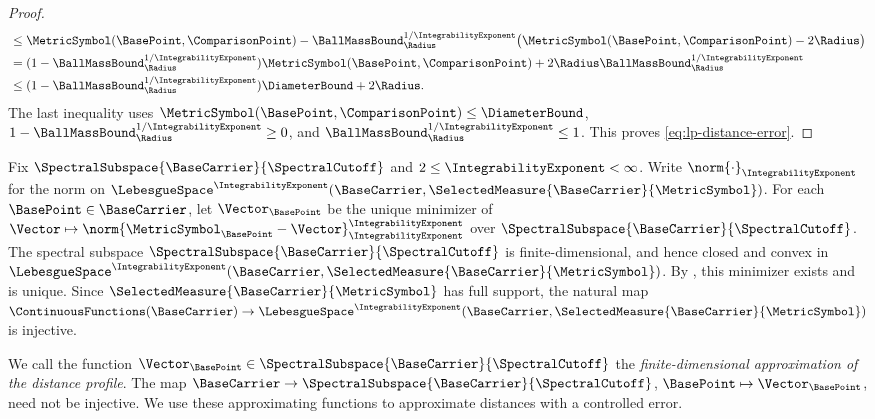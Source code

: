 \begin{proof}
\[\begin{aligned}
 &\leq \MetricSymbol(\BasePoint,\ComparisonPoint)
 -\BallMassBound_\Radius^{1/\IntegrabilityExponent}
 \bigl(\MetricSymbol(\BasePoint,\ComparisonPoint)-2\Radius\bigr)\\
 &= (1-\BallMassBound_\Radius^{1/\IntegrabilityExponent})
      \MetricSymbol(\BasePoint,\ComparisonPoint)
       +2\Radius\BallMassBound_\Radius^{1/\IntegrabilityExponent}\\
 &\leq
 (1-\BallMassBound_\Radius^{1/\IntegrabilityExponent})
      \DiameterBound+2\Radius.
 \end{aligned}
\]
The last inequality uses
$\MetricSymbol(\BasePoint,\ComparisonPoint)\leq\DiameterBound$,
$1-\BallMassBound_\Radius^{1/\IntegrabilityExponent}\geq0$,
and
$\BallMassBound_\Radius^{1/\IntegrabilityExponent}\leq1$.
This proves \eqref{eq:lp-distance-error}.
\end{proof}

Fix
$\SpectralSubspace{\BaseCarrier }{\SpectralCutoff }$
and
$2\leq \IntegrabilityExponent <\infty$.
Write $\norm{\cdot}_\IntegrabilityExponent$ for the norm on
$\LebesgueSpace^\IntegrabilityExponent(\BaseCarrier,\SelectedMeasure{\BaseCarrier}{\MetricSymbol})$.
For each
$\BasePoint \in \BaseCarrier $,
let
$\Vector _\BasePoint $
be the unique minimizer of
$\Vector \mapsto\norm{\MetricSymbol _\BasePoint -\Vector }_\IntegrabilityExponent ^\IntegrabilityExponent $
over
$\SpectralSubspace{\BaseCarrier }{\SpectralCutoff }$.
The spectral subspace
$\SpectralSubspace{\BaseCarrier}{\SpectralCutoff}$
is finite-dimensional,
and hence closed and convex in
$\LebesgueSpace^\IntegrabilityExponent(\BaseCarrier,\SelectedMeasure{\BaseCarrier}{\MetricSymbol})$.
By ,
this minimizer exists and is unique.
Since
$\SelectedMeasure{\BaseCarrier}{\MetricSymbol}$
has full support,
the natural map
$\ContinuousFunctions(\BaseCarrier)\to
 \LebesgueSpace^\IntegrabilityExponent(\BaseCarrier,\SelectedMeasure{\BaseCarrier}{\MetricSymbol})$
is injective.

We call the function
$\Vector_\BasePoint\in\SpectralSubspace{\BaseCarrier}{\SpectralCutoff}$
the \emph{finite-dimensional approximation of the distance profile}.
The map
$\BaseCarrier\to\SpectralSubspace{\BaseCarrier}{\SpectralCutoff}$,
$\BasePoint\mapsto\Vector_\BasePoint$,
need not be injective.
We use these approximating functions to approximate distances with a controlled error.

